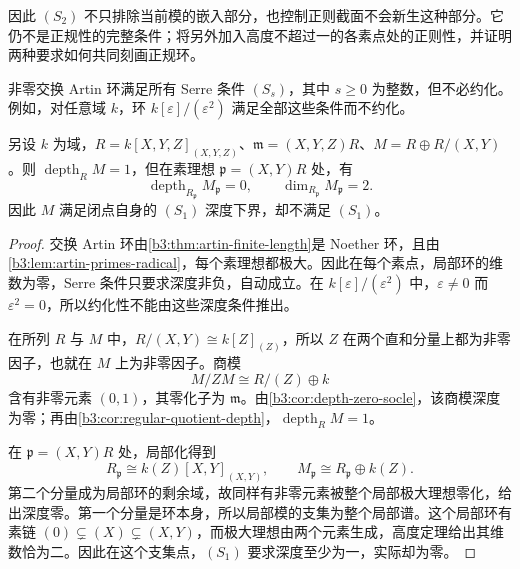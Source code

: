 因此 \((S_2)\) 不只排除当前模的嵌入部分，也控制正则截面不会新生这种部分。它仍不是正规性的完整条件；将另外加入高度不超过一的各素点处的正则性，并证明两种要求如何共同刻画正规环。

\begin{proposition}\label{b3:prop:serre-condition-counterexamples}
	非零交换 Artin 环满足所有 Serre 条件 \((S_s)\)，其中 \(s\ge0\) 为整数，但不必约化。例如，对任意域 \(k\)，环 \(k[\varepsilon]/(\varepsilon^2)\) 满足全部这些条件而不约化。

	另设 \(k\) 为域，\(R=k[X,Y,Z]_{(X,Y,Z)}\)、\(\mathfrak m=(X,Y,Z)R\)、\(M=R\oplus R/(X,Y)\)。则 \(\operatorname{depth}_RM=1\)，但在素理想 \(\mathfrak p=(X,Y)R\) 处，有
	\[
		\operatorname{depth}_{R_{\mathfrak p}}M_{\mathfrak p}=0, \qquad \dim_{R_{\mathfrak p}}M_{\mathfrak p}=2.
	\]
	因此 \(M\) 满足闭点自身的 \((S_1)\) 深度下界，却不满足 \((S_1)\)。
\end{proposition}
\begin{proof}
	交换 Artin 环由\cref{b3:thm:artin-finite-length}是 Noether 环，且由\cref{b3:lem:artin-primes-radical}，每个素理想都极大。因此在每个素点，局部环的维数为零，Serre 条件只要求深度非负，自动成立。在 \(k[\varepsilon]/(\varepsilon^2)\) 中，\(\varepsilon\ne0\) 而 \(\varepsilon^2=0\)，所以约化性不能由这些深度条件推出。

	在所列 \(R\) 与 \(M\) 中，\(R/(X,Y)\cong k[Z]_{(Z)}\)，所以 \(Z\) 在两个直和分量上都为非零因子，也就在 \(M\) 上为非零因子。商模
	\[
		M/ZM\cong R/(Z)\oplus k
	\]
	含有非零元素 \((0,1)\)，其零化子为 \(\mathfrak m\)。由\cref{b3:cor:depth-zero-socle}，该商模深度为零；再由\cref{b3:cor:regular-quotient-depth}，\(\operatorname{depth}_RM=1\)。

	在 \(\mathfrak p=(X,Y)R\) 处，局部化得到
	\[
		R_{\mathfrak p}\cong k(Z)[X,Y]_{(X,Y)},\qquad M_{\mathfrak p}\cong R_{\mathfrak p}\oplus k(Z).
	\]
	第二个分量成为局部环的剩余域，故同样有非零元素被整个局部极大理想零化，给出深度零。第一个分量是环本身，所以局部模的支集为整个局部谱。这个局部环有素链 \((0)\subsetneq(X)\subsetneq(X,Y)\)，而极大理想由两个元素生成，高度定理给出其维数恰为二。因此在这个支集点，\((S_1)\) 要求深度至少为一，实际却为零。
\end{proof}
